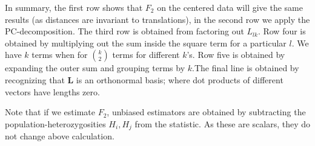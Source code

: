 \documentclass[12pt,a4pape, fullpage]{article}
\newcommand{\ML}{\mathbf{L}} %
\begin{document}
In summary, the first row shows that $F_2$ on the centered data will give the same results (as distances are invariant to translations), in the second row we apply the PC-decomposition. The third row is obtained from factoring out $L_{lk}$. Row four is obtained by multiplying out the sum inside the square term for a particular $l$. We have $k$ terms when for $\binom{k}{2}$ terms for different $k$'s.  Row five is obtained by expanding the outer sum and grouping terms by $k$.The final line is obtained by recognizing that $\ML$ is an orthonormal basis; where dot products of different vectors have lengths zero.

Note that if we estimate $F_2$, unbiased estimators are obtained by subtracting the population-heterozygosities $H_i, H_j$ from the statistic. As these are scalars, they do not change above calculation.

\end{document}
